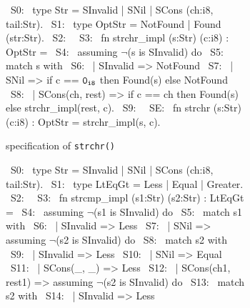 \begin{figure}[H]\ContinuedFloat
\begin{subfigure}[b]{\textwidth}
\begin{center}
\begin{allLangEnvFoot}
~{\tiny \textcolor{mygray}{S0:}}~ type Str = SInvalid | SNil | SCons (ch:i8, tail:Str).
~{\tiny \textcolor{mygray}{S1:}}~ type OptStr = NotFound | Found (str:Str).
~{\tiny \textcolor{mygray}{S2:}}~ 
~{\tiny \textcolor{mygray}{S3:}}~ fn strchr_impl (s:Str) (c:i8) : OptStr =
~{\tiny \textcolor{mygray}{S4:}}~   assuming $\neg$(s is SInvalid) do
~{\tiny \textcolor{mygray}{S5:}}~   match s with
~{\tiny \textcolor{mygray}{S6:}}~   | SInvalid => NotFound
~{\tiny \textcolor{mygray}{S7:}}~   | SNil => if c == ${\tt 0_{i8}}$ then Found(s) else NotFound
~{\tiny \textcolor{mygray}{S8:}}~   | SCons(ch, rest) => if c == ch then Found(s) else strchr_impl(rest, c).
~{\tiny \textcolor{mygray}{S9:}}~ 
~{\tiny \textcolor{mygray}{SE:}}~ fn strchr (s:Str) (c:i8) : OptStr = strchr_impl(s, c).
\end{allLangEnvFoot}
\end{center}
\caption{\SpecL{} specification of {\tt strchr()}}
\end{subfigure}
\begin{subfigure}[b]{\textwidth}
\begin{center}
\begin{allLangEnvFoot}
~{\tiny \textcolor{mygray}{S0:\phantom{ }}}~ type Str = SInvalid | SNil | SCons (ch:i8, tail:Str).
~{\tiny \textcolor{mygray}{S1:\phantom{ }}}~ type LtEqGt = Less | Equal | Greater.
~{\tiny \textcolor{mygray}{S2:\phantom{ }}}~ 
~{\tiny \textcolor{mygray}{S3:\phantom{ }}}~ fn strcmp_impl (s1:Str) (s2:Str) : LtEqGt =
~{\tiny \textcolor{mygray}{S4:\phantom{ }}}~   assuming $\neg$(s1 is SInvalid) do
~{\tiny \textcolor{mygray}{S5:\phantom{ }}}~   match s1 with
~{\tiny \textcolor{mygray}{S6:\phantom{ }}}~   | SInvalid => Less
~{\tiny \textcolor{mygray}{S7:\phantom{ }}}~   | SNil => assuming $\neg$(s2 is SInvalid) do
~{\tiny \textcolor{mygray}{S8:\phantom{ }}}~             match s2 with
~{\tiny \textcolor{mygray}{S9:\phantom{ }}}~             | SInvalid => Less
~{\tiny \textcolor{mygray}{S10:}}~             | SNil => Equal
~{\tiny \textcolor{mygray}{S11:}}~             | SCons(_, _) => Less
~{\tiny \textcolor{mygray}{S12:}}~   | SCons(ch1, rest1) => assuming $\neg$(s2 is SInvalid) do
~{\tiny \textcolor{mygray}{S13:}}~                          match s2 with
~{\tiny \textcolor{mygray}{S14:}}~                          | SInvalid => Less

\end{allLangEnvFoot}
\end{center}
\end{subfigure}
\end{figure}

